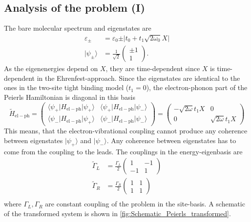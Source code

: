 \documentclass{article}
\begin{document}
\subsection{Analysis of the problem (I)}
The bare molecular spectrum and eigenstates are
\begin{align}
	\varepsilon_\pm &= \varepsilon_0 \pm \vert t_0 +t_1\sqrt{2\omega_0}X\vert\\
	\vert \psi_\pm\rangle &= \frac{1}{\sqrt{2}}\begin{pmatrix}
		\pm 1\\
		1
	\end{pmatrix}.
\end{align}
As the eigenenergies depend on $X$, they are time-dependent since $X$ is time-dependent in the Ehrenfest-approach.
Since the eigenstates are identical to the ones in the two-site tight binding model ($t_1 = 0$), the electron-phonon part of the Peierls Hamiltonian is diagonal in this basis 
\begin{equation}
	\tilde{H}_\mathrm{el-ph} = \begin{pmatrix}
		\langle \psi_+ \vert H_\mathrm{el-ph}\vert \psi_+\rangle & \langle \psi_+ \vert H_\mathrm{el-ph}\vert \psi_-\rangle\\
		\langle \psi_- \vert H_\mathrm{el-ph}\vert \psi_+\rangle & \langle \psi_- \vert H_\mathrm{el-ph}\vert \psi_-\rangle
	\end{pmatrix}
	= \begin{pmatrix}
		-\sqrt{2\omega}t_1 X & 0\\
		0 & \sqrt{2\omega}t_1 X
	\end{pmatrix}
\end{equation}
This means, that the electron-vibrational coupling cannot produce any coherence between eigenstates $\vert \psi_+\rangle$ and $\vert \psi_-\rangle$. Any coherence between eigenstates has to come from the coupling to the leads. The couplings in the energy-eigenbasis are
\begin{align}
	\tilde{\Gamma}_L &=  \frac{\Gamma_L}{2}\begin{pmatrix}
		1 & -1 \\
		-1 & 1
	\end{pmatrix}\\
	\tilde{\Gamma}_R &=  \frac{\Gamma_R}{2}\begin{pmatrix}
		1 & 1 \\
		1 & 1
	\end{pmatrix}\\
\end{align}
where $\Gamma_L, \Gamma_R$ are constant coupling of the problem in the site-basis. A schematic of the transformed system is shown in \cref{fig:Schematic_Peierls_transformed}.
\end{document}

